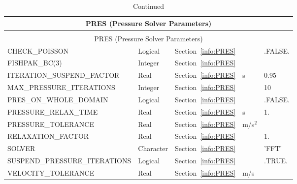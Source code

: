 \documentclass[11pt]{book}
\begin{document}
\begin{longtable}{@{\extracolsep{\fill}}|l|l|l|l|l|}
\caption[Pressure solver parameters ({\ct PRES} namelist group)]{For more information see Section~\ref{info:PRES}.}
\label{tbl:PRES} \\
\hline
\multicolumn{5}{|c|}{{\ct PRES} (Pressure Solver Parameters)} \\
\hline \hline
\endfirsthead
\caption[]{Continued} \\
\hline
\multicolumn{5}{|c|}{{\ct PRES} (Pressure Solver Parameters)} \\
\hline \hline
\endhead
{\ct CHECK\_POISSON}                & Logical       & Section~\ref{info:PRES}           &               & {\ct .FALSE.}             \\ \hline
{\ct FISHPAK\_BC(3)}                & Integer       & Section~\ref{info:PRES}           &               &                           \\ \hline
{\ct ITERATION\_SUSPEND\_FACTOR}    & Real          & Section~\ref{info:PRES}           & s             & 0.95                      \\ \hline
{\ct MAX\_PRESSURE\_ITERATIONS}     & Integer       & Section~\ref{info:PRES}           &               & 10                        \\ \hline
{\ct PRES\_ON\_WHOLE\_DOMAIN}       & Logical       & Section~\ref{info:PRES}           &               & {\ct .FALSE.}             \\ \hline
{\ct PRESSURE\_RELAX\_TIME}         & Real          & Section~\ref{info:PRES}           & s             & 1.                        \\ \hline
{\ct PRESSURE\_TOLERANCE}           & Real          & Section~\ref{info:PRES}           & m/s$^2$       &                           \\ \hline
{\ct RELAXATION\_FACTOR}            & Real          & Section~\ref{info:PRES}           &               & 1.                        \\ \hline
{\ct SOLVER}                        & Character     & Section~\ref{info:PRES}           &               & {\ct 'FFT'}               \\ \hline
{\ct SUSPEND\_PRESSURE\_ITERATIONS} & Logical       & Section~\ref{info:PRES}           &               & {\ct .TRUE.}              \\ \hline
{\ct VELOCITY\_TOLERANCE}           & Real          & Section~\ref{info:PRES}           & m/s           &                           \\ \hline
\end{longtable}
\end{document}
